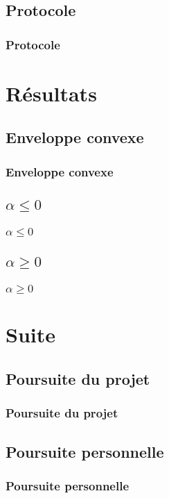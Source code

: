 \documentclass{beamer}
\begin{document}
\subsection{Protocole}
\begin{frame}
\frametitle{Protocole}
\end{frame}

\section{Résultats}

\subsection{Enveloppe convexe}
\begin{frame}
\frametitle{Enveloppe convexe}
\end{frame}

\subsection{$\alpha \leq 0$}
\begin{frame}
\frametitle{$\alpha \leq 0$}
\end{frame}

\subsection{$\alpha \geq 0$}
\begin{frame}
\frametitle{$\alpha \geq 0$}
\end{frame}

\section{Suite}

\subsection{Poursuite du projet}
\begin{frame}
\frametitle{Poursuite du projet}
\end{frame}

\subsection{Poursuite personnelle}
\begin{frame}
\frametitle{Poursuite personnelle}


\end{frame}

\end{document}
